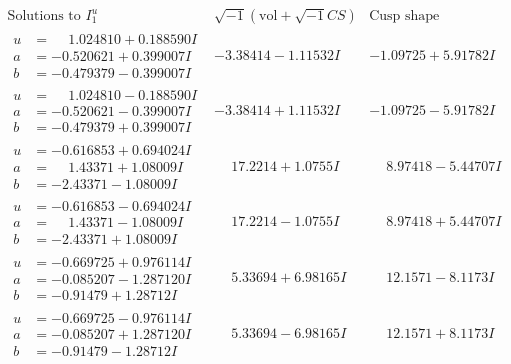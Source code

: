 \documentclass[1p]{elsarticle_modified}
\theoremstyle{definition}
\newcommand{\I}{\sqrt{-1}}
\begin{document}
$$\begin{array}{c|c|c}  
\text{Solutions to }I^u_{1}& \I (\text{vol} + \sqrt{-1}CS) & \text{Cusp shape}\\
 \hline 
\begin{aligned}
u &= \phantom{-}1.024810 + 0.188590 I \\
a &= -0.520621 + 0.399007 I \\
b &= -0.479379 - 0.399007 I\end{aligned}
 & -3.38414 - 1.11532 I & -1.09725 + 5.91782 I \\ \hline\begin{aligned}
u &= \phantom{-}1.024810 - 0.188590 I \\
a &= -0.520621 - 0.399007 I \\
b &= -0.479379 + 0.399007 I\end{aligned}
 & -3.38414 + 1.11532 I & -1.09725 - 5.91782 I \\ \hline\begin{aligned}
u &= -0.616853 + 0.694024 I \\
a &= \phantom{-}1.43371 + 1.08009 I \\
b &= -2.43371 - 1.08009 I\end{aligned}
 & \phantom{-}17.2214 + 1.0755 I & \phantom{-}8.97418 - 5.44707 I \\ \hline\begin{aligned}
u &= -0.616853 - 0.694024 I \\
a &= \phantom{-}1.43371 - 1.08009 I \\
b &= -2.43371 + 1.08009 I\end{aligned}
 & \phantom{-}17.2214 - 1.0755 I & \phantom{-}8.97418 + 5.44707 I \\ \hline\begin{aligned}
u &= -0.669725 + 0.976114 I \\
a &= -0.085207 - 1.287120 I \\
b &= -0.91479 + 1.28712 I\end{aligned}
 & \phantom{-}5.33694 + 6.98165 I & \phantom{-}12.1571 - 8.1173 I \\ \hline\begin{aligned}
u &= -0.669725 - 0.976114 I \\
a &= -0.085207 + 1.287120 I \\
b &= -0.91479 - 1.28712 I\end{aligned}
 & \phantom{-}5.33694 - 6.98165 I & \phantom{-}12.1571 + 8.1173 I \\ \hline\begin{aligned}

\end{aligned}
\end{array}$$
\end{document}
